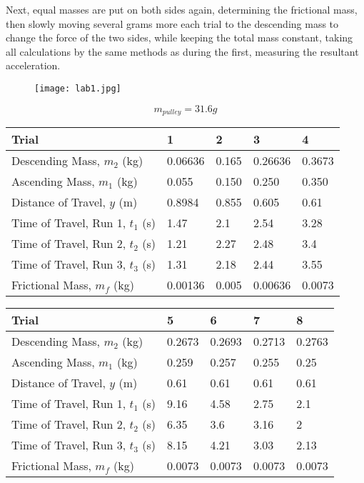 \documentclass[11pt, titlepage]{article}
\begin{document}
Next, equal masses are put on both sides again, determining the frictional mass, then slowly moving several grams more each trial to the descending mass to change the force of the two sides, while keeping the total mass constant, taking all calculations by the same methods as during the first, measuring the resultant acceleration.

\begin{figure}[p]
\centering
\hspace*{-10.5cm}
\texttt{[image: lab1.jpg]}
\vspace*{1cm}
\end{figure}

\begin{center}
$$m_{pulley} = 31.6 g$$
\begin{tabular}
{|m{7em}|m{7em}|m{7em}|m{7em}|m{7em}|}
\hline
Trial & 1 & 2 & 3 & 4 \\
\hline
Descending Mass, $m_2$ (kg) & 0.06636 & 0.165 & 0.26636 & 0.3673\\
\hline
Ascending Mass, $m_1$ (kg) & 0.055 & 0.150 & 0.250 & 0.350\\
\hline
Distance of Travel, $y$ (m) & 0.8984 & 0.855 & 0.605 & 0.61\\
\hline
Time of Travel, Run 1, $t_1$ (s) & 1.47 & 2.1 & 2.54 & 3.28\\
\hline
Time of Travel, Run 2, $t_2$ (s) & 1.21 & 2.27 & 2.48 & 3.4\\
\hline
Time of Travel, Run 3, $t_3$ (s) & 1.31 & 2.18 & 2.44 & 3.55\\
\hline
Frictional Mass, $m_f$ (kg) & 0.00136 & 0.005 & 0.00636 & 0.0073\\
\hline
\end{tabular}
\begin{tabular}
{|m{7em}|m{7em}|m{7em}|m{7em}|m{7em}|}
\hline
Trial & 5 & 6 & 7 & 8 \\
\hline
Descending Mass, $m_2$ (kg) & 0.2673 & 0.2693 & 0.2713& 0.2763\\
\hline
Ascending Mass, $m_1$ (kg) & 0.259 & 0.257 & 0.255 & 0.25\\
\hline
Distance of Travel, $y$ (m) & 0.61 & 0.61 & 0.61 & 0.61\\
\hline
Time of Travel, Run 1, $t_1$ (s) & 9.16& 4.58& 2.75& 2.1\\
\hline
Time of Travel, Run 2, $t_2$ (s) & 6.35& 3.6 & 3.16 & 2\\
\hline
Time of Travel, Run 3, $t_3$ (s) & 8.15& 4.21 & 3.03 & 2.13\\
\hline
Frictional Mass, $m_f$ (kg) & 0.0073 & 0.0073 & 0.0073 & 0.0073\\
\hline
\end{tabular}
\end{center}
\end{document}
